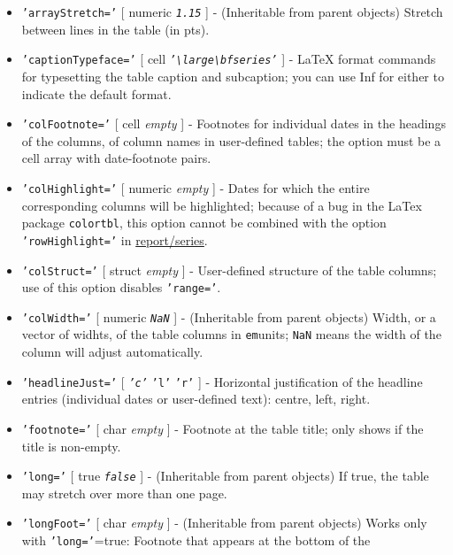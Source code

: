  \begin{itemize}
 \item
   \texttt{'arrayStretch='} {[} numeric \textbar{} \emph{\texttt{1.15}}
   {]} - (Inheritable from parent objects) Stretch between lines in the
   table (in pts).
 \item
   \texttt{'captionTypeface='} {[} cell \textbar{}
   \emph{\texttt{'\textbackslash{}large\textbackslash{}bfseries'}} {]} -
   LaTeX format commands for typesetting the table caption and
   subcaption; you can use Inf for either to indicate the default format.
 \item
   \texttt{'colFootnote='} {[} cell \textbar{} \emph{empty} {]} -
   Footnotes for individual dates in the headings of the columns, of
   column names in user-defined tables; the option must be a cell array
   with date-footnote pairs.
 \item
   \texttt{'colHighlight='} {[} numeric \textbar{} \emph{empty} {]} -
   Dates for which the entire corresponding columns will be highlighted;
   because of a bug in the LaTex package \texttt{colortbl}, this option
   cannot be combined with the option \texttt{'rowHighlight='} in
   \url{report/series}.
 \item
   \texttt{'colStruct='} {[} struct \textbar{} \emph{empty} {]} -
   User-defined structure of the table columns; use of this option
   disables \texttt{'range='}.
 \item
   \texttt{'colWidth='} {[} numeric \textbar{} \emph{\texttt{NaN}} {]} -
   (Inheritable from parent objects) Width, or a vector of widhts, of the
   table columns in \texttt{em}units; \texttt{NaN} means the width of the
   column will adjust automatically.
 \item
   \texttt{'headlineJust='} {[} \emph{\texttt{'c'}} \textbar{}
   \texttt{'l'} \textbar{} \texttt{'r'} {]} - Horizontal justification of
   the headline entries (individual dates or user-defined text): centre,
   left, right.
 \item
   \texttt{'footnote='} {[} char \textbar{} \emph{empty} {]} - Footnote
   at the table title; only shows if the title is non-empty.
 \item
   \texttt{'long='} {[} true \textbar{} \emph{\texttt{false}} {]} -
   (Inheritable from parent objects) If true, the table may stretch over
   more than one page.
 \item
   \texttt{'longFoot='} {[} char \textbar{} \emph{empty} {]} -
   (Inheritable from parent objects) Works only with
   \texttt{'long='}=true: Footnote that appears at the bottom of the

\end{itemize}
